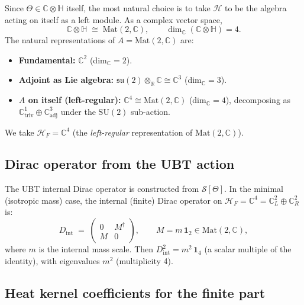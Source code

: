 \documentclass[11pt,a4paper]{article}
\theoremstyle{definition}
\theoremstyle{remark}
\begin{document}
Since $\Theta \in \mathbb{C}\otimes\mathbb{H}$ itself, the most natural
choice is to take $\mathcal{H}$ to be the algebra acting on itself as
a left module.
As a complex vector space,
\begin{equation}
  \mathbb{C}\otimes\mathbb{H} \;\cong\; \mathrm{Mat}(2,\mathbb{C}),
  \qquad
  \dim_\mathbb{C}(\mathbb{C}\otimes\mathbb{H}) = 4.
\end{equation}
The natural representations of $A = \mathrm{Mat}(2,\mathbb{C})$ are:
\begin{itemize}
  \item \textbf{Fundamental:} $\mathbb{C}^2$ (dim$_\mathbb{C} = 2$).
  \item \textbf{Adjoint as Lie algebra:} $\mathfrak{su}(2) \otimes_\mathbb{R}\mathbb{C}
    \cong \mathbb{C}^3$ (dim$_\mathbb{C} = 3$).
  \item \textbf{$A$ on itself (left-regular):} $\mathbb{C}^4 \cong \mathrm{Mat}(2,\mathbb{C})$
    (dim$_\mathbb{C} = 4$), decomposing as $\mathbb{C}^1_{\mathrm{triv}} \oplus
    \mathbb{C}^3_{\mathrm{adj}}$ under the $\mathrm{SU}(2)$ sub-action.
\end{itemize}
We take $\mathcal{H}_F = \mathbb{C}^4$ (the \emph{left-regular} representation
of $\mathrm{Mat}(2,\mathbb{C})$).

\subsection{Dirac operator from the UBT action}

The UBT internal Dirac operator is constructed from $\mathcal{S}[\Theta]$.
In the minimal (isotropic mass) case, the internal (finite) Dirac operator on
$\mathcal{H}_F = \mathbb{C}^4 = \mathbb{C}^2_L \oplus \mathbb{C}^2_R$ is:
\begin{equation}
  D_{\mathrm{int}} \;=\; \begin{pmatrix} 0 & M^\dagger \\ M & 0 \end{pmatrix},
  \qquad M = m\,\mathbf{1}_2 \in \mathrm{Mat}(2,\mathbb{C}),
  \label{eq:Dint}
\end{equation}
where $m$ is the internal mass scale.
Then $D_{\mathrm{int}}^2 = m^2\,\mathbf{1}_4$ (a scalar multiple of the
identity), with eigenvalues $m^2$ (multiplicity 4).

\subsection{Heat kernel coefficients for the finite part}
\end{document}
